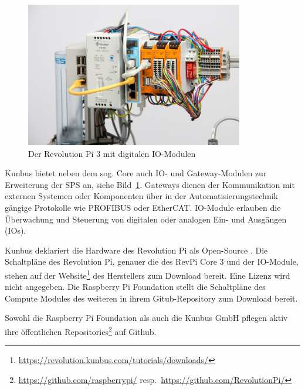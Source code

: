 \begin{figure}
    \centering
    \includegraphics[trim={13cm 5cm 1cm 3cm}, clip, width=0.85\textwidth]{../photos/serverless_plc_img_8}
    \caption{Der Revolution Pi 3 mit digitalen IO-Modulen}
    \label{fig:rev-pi-io}
\end{figure}

Kunbus bietet neben dem sog. Core auch IO- und Gateway-Modulen zur Erweiterung der SPS an, siehe Bild~\ref{fig:rev-pi-io}.
Gateways dienen der Kommunikation mit externen Systemen oder Komponenten
über in der Automatisierungstechnik gängige Protokolle wie PROFIBUS oder EtherCAT. 
IO-Module erlauben die Überwachung und Steuerung von digitalen oder analogen Ein- und Ausgängen (IOs).

Kunbus deklariert die Hardware des Revolution Pi als Open-Source \citep[vgl.][S. 4]{flyer-revpi}. 
Die Schaltpläne des Revolution Pi, genauer die des RevPi Core 3 und der IO-Module, stehen auf der
Website\footnote{\label{downloads}\url{https://revolution.kunbus.com/tutorials/downloads/}} des Herstellers zum 
Download bereit. Eine Lizenz wird nicht angegeben.
Die Raspberry Pi Foundation stellt die Schaltpläne des Compute Modules des weiteren in ihrem Gitub-Repository 
zum Download bereit.

Sowohl die Raspberry Pi Foundation als auch die Kunbus GmbH pflegen aktiv ihre öffentlichen Repositories\footnote{\url{https://github.com/raspberrypi/} resp.~\url{https://github.com/RevolutionPi/}}
auf Github. 


